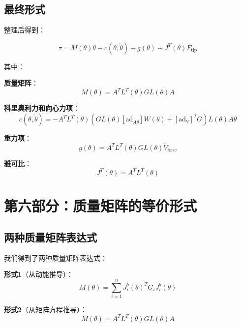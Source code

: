 \documentclass[12pt,a4paper]{article}
\begin{document}
\subsection{最终形式}

整理后得到：

\begin{equation}
\tau = M(\theta)\ddot{\theta} + c(\theta, \dot{\theta}) + g(\theta) + J^T(\theta)F_{\text{tip}}
\label{eq:final_dynamics}
\end{equation}

其中：

\textbf{质量矩阵}：
\begin{equation}
M(\theta) = A^T L^T(\theta)GL(\theta)A
\label{eq:M_final}
\end{equation}

\textbf{科里奥利力和向心力项}：
\begin{equation}
c(\theta, \dot{\theta}) = -A^T L^T(\theta)\left(GL(\theta)[\text{ad}_{A\dot{\theta}}]W(\theta) + [\text{ad}_V]^T G\right)L(\theta)A\dot{\theta}
\label{eq:c_final}
\end{equation}

\textbf{重力项}：
\begin{equation}
g(\theta) = A^T L^T(\theta)GL(\theta)\dot{V}_{\text{base}}
\label{eq:g_final}
\end{equation}

\textbf{雅可比}：
\begin{equation}
J^T(\theta) = A^T L^T(\theta)
\label{eq:J_final}
\end{equation}

\section{第六部分：质量矩阵的等价形式}

\subsection{两种质量矩阵表达式}

我们得到了两种质量矩阵表达式：

\textbf{形式1}（从动能推导）：
\begin{equation}
M(\theta) = \sum_{i=1}^{n} J_i^b(\theta)^T G_i J_i^b(\theta)
\end{equation}

\textbf{形式2}（从矩阵方程推导）：
\begin{equation}
M(\theta) = A^T L^T(\theta)GL(\theta)A
\end{equation}
\end{document}
